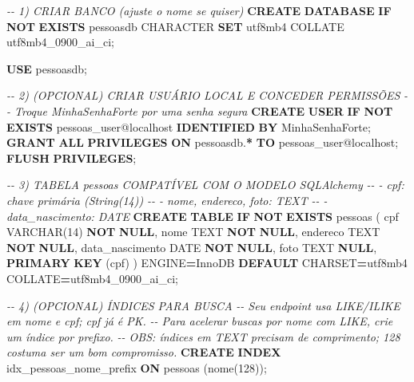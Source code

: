 \documentclass[
]{book}
\newenvironment{Shaded}{\begin{snugshade}}{\end{snugshade}}
\newcommand{\CommentTok}[1]{\textcolor[rgb]{0.56,0.35,0.01}{\textit{#1}}}
\newcommand{\ControlFlowTok}[1]{\textcolor[rgb]{0.13,0.29,0.53}{\textbf{#1}}}
\newcommand{\DataTypeTok}[1]{\textcolor[rgb]{0.13,0.29,0.53}{#1}}
\newcommand{\DecValTok}[1]{\textcolor[rgb]{0.00,0.00,0.81}{#1}}
\newcommand{\FunctionTok}[1]{\textcolor[rgb]{0.13,0.29,0.53}{\textbf{#1}}}
\newcommand{\KeywordTok}[1]{\textcolor[rgb]{0.13,0.29,0.53}{\textbf{#1}}}
\newcommand{\NormalTok}[1]{#1}
\newcommand{\OperatorTok}[1]{\textcolor[rgb]{0.81,0.36,0.00}{\textbf{#1}}}
\newcommand{\StringTok}[1]{\textcolor[rgb]{0.31,0.60,0.02}{#1}}
\begin{document}
\begin{Shaded}
\begin{Highlighting}[]
\CommentTok{{-}{-} 1) CRIAR BANCO (ajuste o nome se quiser)}
\KeywordTok{CREATE} \KeywordTok{DATABASE} \ControlFlowTok{IF} \KeywordTok{NOT} \KeywordTok{EXISTS}\NormalTok{ pessoasdb}
  \DataTypeTok{CHARACTER} \KeywordTok{SET}\NormalTok{ utf8mb4}
\NormalTok{  COLLATE utf8mb4\_0900\_ai\_ci;}

\KeywordTok{USE}\NormalTok{ pessoasdb;}

\CommentTok{{-}{-} 2) (OPCIONAL) CRIAR USUÁRIO LOCAL E CONCEDER PERMISSÕES}
\CommentTok{{-}{-}    Troque \textquotesingle{}MinhaSenhaForte\textquotesingle{} por uma senha segura}
\KeywordTok{CREATE} \FunctionTok{USER} \ControlFlowTok{IF} \KeywordTok{NOT} \KeywordTok{EXISTS} \StringTok{\textquotesingle{}pessoas\_user\textquotesingle{}}\NormalTok{@}\StringTok{\textquotesingle{}localhost\textquotesingle{}} \KeywordTok{IDENTIFIED} \KeywordTok{BY} \StringTok{\textquotesingle{}MinhaSenhaForte\textquotesingle{}}\NormalTok{;}
\KeywordTok{GRANT} \KeywordTok{ALL} \KeywordTok{PRIVILEGES} \KeywordTok{ON}\NormalTok{ pessoasdb.}\OperatorTok{*} \KeywordTok{TO} \StringTok{\textquotesingle{}pessoas\_user\textquotesingle{}}\NormalTok{@}\StringTok{\textquotesingle{}localhost\textquotesingle{}}\NormalTok{;}
\KeywordTok{FLUSH} \KeywordTok{PRIVILEGES}\NormalTok{;}

\CommentTok{{-}{-} 3) TABELA \textquotesingle{}pessoas\textquotesingle{} COMPATÍVEL COM O MODELO SQLAlchemy}
\CommentTok{{-}{-}    {-} cpf: chave primária (String(14))}
\CommentTok{{-}{-}    {-} nome, endereco, foto: TEXT}
\CommentTok{{-}{-}    {-} data\_nascimento: DATE}
\KeywordTok{CREATE} \KeywordTok{TABLE} \ControlFlowTok{IF} \KeywordTok{NOT} \KeywordTok{EXISTS}\NormalTok{ pessoas (}
\NormalTok{  cpf             }\DataTypeTok{VARCHAR}\NormalTok{(}\DecValTok{14}\NormalTok{)  }\KeywordTok{NOT} \KeywordTok{NULL}\NormalTok{,}
\NormalTok{  nome            TEXT         }\KeywordTok{NOT} \KeywordTok{NULL}\NormalTok{,}
\NormalTok{  endereco        TEXT         }\KeywordTok{NOT} \KeywordTok{NULL}\NormalTok{,}
\NormalTok{  data\_nascimento }\DataTypeTok{DATE}         \KeywordTok{NOT} \KeywordTok{NULL}\NormalTok{,}
\NormalTok{  foto            TEXT         }\KeywordTok{NULL}\NormalTok{,}
  \KeywordTok{PRIMARY} \KeywordTok{KEY}\NormalTok{ (cpf)}
\NormalTok{) ENGINE}\OperatorTok{=}\NormalTok{InnoDB }\KeywordTok{DEFAULT}\NormalTok{ CHARSET}\OperatorTok{=}\NormalTok{utf8mb4 COLLATE}\OperatorTok{=}\NormalTok{utf8mb4\_0900\_ai\_ci;}

\CommentTok{{-}{-} 4) (OPCIONAL) ÍNDICES PARA BUSCA}
\CommentTok{{-}{-} Seu endpoint usa LIKE/ILIKE em nome e cpf; cpf já é PK.}
\CommentTok{{-}{-} Para acelerar buscas por nome com LIKE, crie um índice por prefixo.}
\CommentTok{{-}{-} OBS: índices em TEXT precisam de comprimento; 128 costuma ser um bom compromisso.}
\KeywordTok{CREATE} \KeywordTok{INDEX}\NormalTok{ idx\_pessoas\_nome\_prefix }\KeywordTok{ON}\NormalTok{ pessoas (nome(}\DecValTok{128}\NormalTok{));}
\end{Highlighting}
\end{Shaded}
\end{document}
